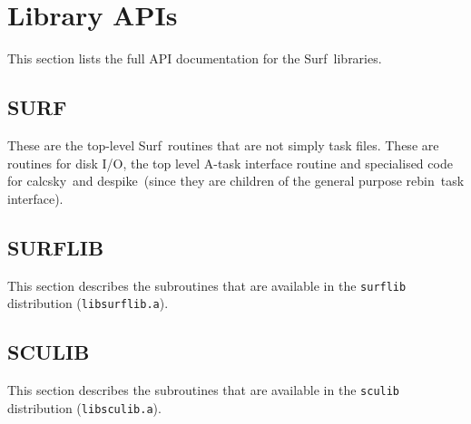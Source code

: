 \documentclass[twoside,11pt]{article}
\newcommand{\task}[1]{{\sf #1}}
\newcommand{\rebin}{\xref{\task{rebin}}{sun216}{REBIN}}
\newcommand{\calcsky}{\xref{\task{calcsky}}{sun216}{CALCSKY}}
\newcommand{\despike}{\xref{\task{despike}}{sun216}{DESPIKE}}
\newcommand{\scusoft}          {{\sc Surf}}
\newcommand{\xref}[3]{#1}
\renewcommand{\_}{\texttt{\symbol{95}}}
\begin{document}
\section{Library APIs}

This section lists the full API documentation for the \scusoft\
libraries.

\subsection{SURF}

These are the top-level \scusoft\ routines that are not simply task files.
These are routines for disk I/O, the top level A-task interface routine
and specialised code for \calcsky\ and \despike\ (since they are children
of the general purpose \rebin\ task interface).



\subsection{SURFLIB}

This section describes the subroutines that are available in the
\texttt{surflib} distribution (\texttt{libsurflib.a}).




\subsection{SCULIB}

This section describes the subroutines that are available in the
\texttt{sculib} distribution (\texttt{libsculib.a}).





\end{document}

